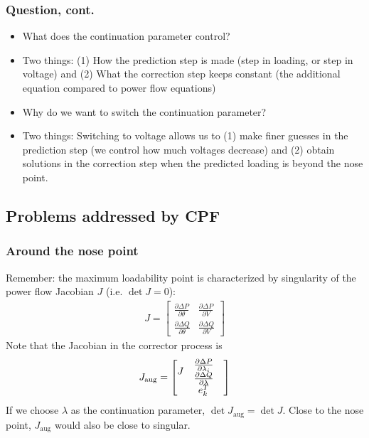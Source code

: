 \documentclass{beamer}
\begin{document}
\begin{frame}
  \frametitle{Question, cont.}
  \begin{itemize}[<visible@+->]
  \item What does the continuation parameter control?
  \item Two things: (1) How the prediction step is made (step in loading, or step in voltage) and (2) What the correction step keeps constant (the additional equation compared to power flow equations)
  \item Why do we want to switch the continuation parameter?
  \item Two things: Switching to voltage allows us to (1) make finer guesses in the prediction step (we control how much voltages decrease) and (2) obtain solutions in the correction step when the predicted loading is beyond the nose point.
  \end{itemize}
\end{frame}

\subsection{Problems addressed by CPF}

\begin{frame}
  \frametitle{Around the nose point}
Remember: the maximum loadability point is characterized by singularity of the power flow Jacobian $J$ (i.e. $\det J = 0$):
\begin{align}
  \label{eq:9}
  J = \begin{bmatrix}
  \frac{\partial \Delta P}{\partial \theta} & \frac{\partial \Delta P}{\partial V} \\
  \frac{\partial \Delta Q}{\partial \theta} & \frac{\partial \Delta Q}{\partial V}
  \end{bmatrix}
\end{align}
Note that the Jacobian in the corrector process is
\begin{align}
  \label{eq:9}
  J_\text{aug} = \begin{bmatrix}
  \begin{matrix} \vphantom{\begin{matrix} 0 \\ 0 \end{matrix}} 
  J 
 \end{matrix} & \begin{matrix} \frac{\partial \Delta P}{\partial \lambda_i} \\
  \frac{\partial \Delta Q}{\partial \lambda}
  \end{matrix} \\
   & e_k^T & 
  \end{bmatrix}
\end{align}
If we choose $\lambda$ as the continuation parameter, $\det J_\text{aug} = \det J$.
Close to the nose point, $J_\text{aug}$ would also be close to singular.
\end{frame}
\end{document}
